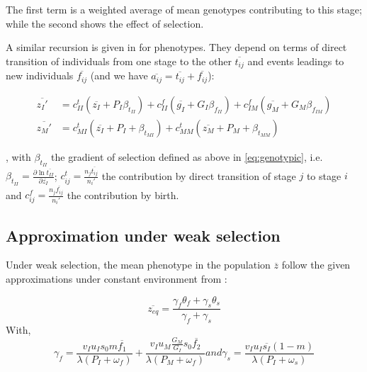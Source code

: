 The first term is a weighted average of mean genotypes contributing to this stage; while the second shows the effect of selection.

A similar recursion is given in \citep{barfield_evolution_2011} for phenotypes. They depend on terms of direct transition of individuals from one stage to the other $\overline{t_{ij}}$ and events leadings to new individuals $\overline{f_{ij}}$ (and we have $\overline{a_{ij}} = \overline{t_{ij}} + \overline{f_{ij}}$):

\begin{subequations}
	\begin{align}
	\label{eq:phenotypic}
	\overline{z_I'} &= c_{II}^t (\overline{z_I} + P_I \beta_{t_{II}}) + c_{II}^f (\overline{g_I} + G_I \beta_{f_{II}}) + c_{IM}^f (\overline{g_M} + G_M \beta_{f_{IM}}) \\
	\overline{z_M'} &= c_{MI}^t (\overline{z_I} + P_I + \beta_{t_{MI}}) + c_{MM}^t (\overline{z_M} + P_M + \beta_{t_{MM}})
	\end{align}
\end{subequations}

, with $\beta_{t_{II}}$ the gradient of selection defined as above in \autoref{eq:genotypic}, i.e. $\beta_{t_{II}} = \frac{\partial \ln \overline{t_{II}}}{\partial \overline{z_I}}$; $c_{ij}^t = \frac{n_j \overline{t_{ij}}}{n_i'}$ the contribution by direct transition of stage $j$ to stage $i$ and $c_{ij}^f = \frac{n_j \overline{f_{ij}}}{n_i'}$ the contribution by birth.

\subsection*{Approximation under weak selection}

Under weak selection, the mean phenotype in the population $\overline{z}$ follow the given approximations under constant environment from \citep{engen_evolution_2011}:

\begin{equation}
	\label{eq:zweak}
	\overline{z_{eq}} = \frac{\gamma_{f}\theta_{f} + \gamma_{s}\theta_{s}}{\gamma_{f} + \gamma_{s}}
\end{equation}
With,
\begin{subequations}
	\begin{equation}
	\label{eq:gammaf}
	\gamma_{f} = \frac{v_{I} u_{I} s_{0} m \overline{f_{1}} }{\lambda(P_{I}+\omega_{f})} + \frac{ v_{I} u_{M} \frac{G_{M}}{G_{I}} s_{0} \overline{f_{2}}}{\lambda ( P_{M} + \omega_{f} )}
	\end{equation}
	and
	\begin{equation}
	\label{eq:gammas}
	\gamma_{s} = \frac{ v_{I} u_{I} \overline{s_{I}} (1-m) }{\lambda(P_{I}+\omega_{s})}
	\end{equation}
\end{subequations}


